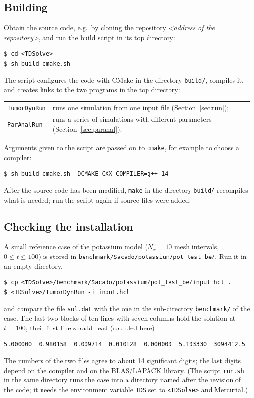 \documentclass[11pt]{article}
\newcommand{\repourl}{\textit{<address of the repository>}}
\newcommand{\code}[1]{\texttt{#1}}
\begin{document}
\subsection{Building}
Obtain the source code, e.g.\ by cloning the repository \repourl, and run the build script in its top directory:
\begin{lstlisting}
$ cd <TDSolve>
$ sh build_cmake.sh
\end{lstlisting}
The script configures the code with CMake in the directory \code{build/}, compiles it, and creates links to the two programs in the top directory:
\begin{center}
\begin{tabular}{ll}
  \code{TumorDynRun} & runs one simulation from one input file (Section~\ref{sec:run}); \\
  \code{ParAnalRun}  & runs a series of simulations with different parameters (Section~\ref{sec:paranal}).
\end{tabular}
\end{center}
Arguments given to the script are passed on to \code{cmake}, for example to choose a compiler:
\begin{lstlisting}
$ sh build_cmake.sh -DCMAKE_CXX_COMPILER=g++-14
\end{lstlisting}
After the source code has been modified, \code{make} in the directory \code{build/} recompiles what is needed; run the script again if source files were added.

\subsection{Checking the installation}
\label{sec:check}
A small reference case of the potassium model ($N_x=10$ mesh intervals, $0\le t\le 100$) is stored in \code{benchmark/Sacado/potassium/pot\_test\_be/}.
Run it in an empty directory,
\begin{lstlisting}
$ cp <TDSolve>/benchmark/Sacado/potassium/pot_test_be/input.hcl .
$ <TDSolve>/TumorDynRun -i input.hcl
\end{lstlisting}
and compare the file \code{sol.dat} with the one in the sub-directory \code{benchmark/} of the case.
The last two blocks of ten lines with seven columns hold the solution at $t=100$; their first line should read (rounded here)
\begin{lstlisting}
5.000000  0.980158  0.009714  0.010128  0.000000  5.103330  3094412.5
\end{lstlisting}
The numbers of the two files agree to about 14 significant digits; the last digits depend on the compiler and on the BLAS/LAPACK library.
(The script \code{run.sh} in the same directory runs the case into a directory named after the revision of the code; it needs the environment variable \code{TDS} set to \code{<TDSolve>} and Mercurial.)
\end{document}
